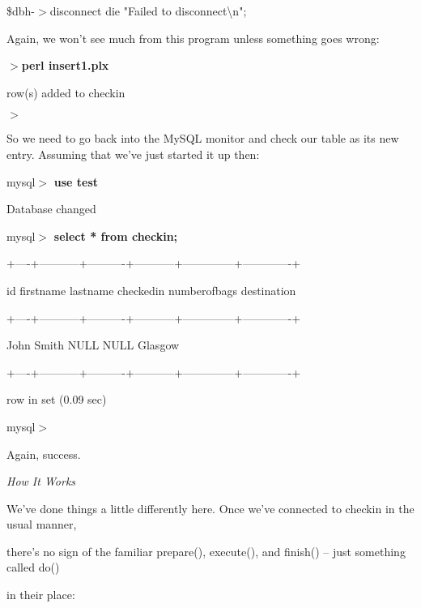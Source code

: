 \documentclass[a4paper,11pt]{book}
\begin{document}
\noindent \$dbh-$>$disconnect \textbar \textbar  die "Failed to disconnect\textbackslash n";

\noindent 

\noindent Again, we won't see much from this program unless something goes wrong:

\noindent 

\noindent 

\noindent $>$\textbf{perl insert1.plx}

 row(s) added to checkin

\noindent $>$

\noindent 

\noindent So we need to go back into the MySQL monitor and check our table as its new entry. Assuming that we've just started it up then:

\noindent 

\noindent mysql$>$ \textbf{use test}

\noindent Database changed

\noindent mysql$>$ \textbf{select * from checkin;}

\noindent +----+-----------+----------+-----------+--------------+-------------+

\noindent \textbar  id \textbar  firstname \textbar  lastname \textbar  checkedin \textbar  numberofbags \textbar  destination \textbar 

\noindent +----+-----------+----------+-----------+--------------+-------------+

\noindent {} \textbar  John \textbar  Smith \textbar  NULL \textbar  NULL \textbar  Glasgow \textbar 

\noindent +----+-----------+----------+-----------+--------------+-------------+

 row in set (0.09 sec)

\noindent mysql$>$

\noindent 

\noindent Again, success.

\noindent 

\noindent \textit{How It Works}

\noindent We've done things a little differently here. Once we've connected to checkin in the usual manner,

\noindent there's no sign of the familiar prepare(), execute(), and finish() -- just something called do()

\noindent in their place:

\noindent 
\end{document}
